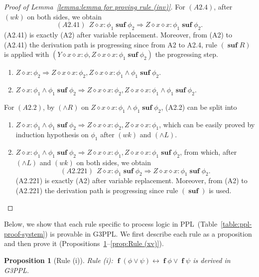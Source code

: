 \documentclass[manuscript,screen]{acmart}
\newtheorem{prop}{Proposition}[section]
\newcommand{\cat}[0]{\diamond}
\newcommand{\GiiiPPLcyc}[0]{\mbox{G3PPL}}
\DeclareMathOperator{\ofst}{\mathbf{f}}
\DeclareMathOperator{\osuf}{\mathbf{suf}}
\newcommand{\PPL}[0]{\mbox{PPL}}
\begin{document}
\begin{proof}[Proof of Lemma~\ref{lemma:lemma for proving rule (inv)}]
For $(A2.4)$, after $(wk)$ on both sides, we obtain
$$
(A2.41)\ \ Z\cat x : \phi_1\osuf\phi_2\Rightarrow Z\cat x\cat x : \phi_1\osuf\phi_2. 
$$
(A2.41) is exactly (A2) after variable replacement. Moreover, from (A2) to (A2.41) the derivation path is progressing since from A2 to A2.4, rule $(\osuf R)$ is applied with $(Y \cat x\cat x : \phi, Z\cat x\cat x : \phi_1\osuf \phi_2)$ the progressing step. 

\ifx
\begin{enumerate}
\item[(A2.1)] $Z\cat x : \phi_2\Rightarrow Z\cat x\cat x : \phi_2, Z\cat x\cat x : \phi_1\wedge \phi_1\osuf \phi_2$. 

\item[(A2.2)] $Z\cat x : \phi_1\wedge \phi_1\osuf \phi_2\Rightarrow Z\cat x\cat x : \phi_2, Z\cat x\cat x : \phi_1\wedge \phi_1\osuf \phi_2$.  
\end{enumerate} 





For $(A2.2)$, by $(\wedge R)$ on $Z\cat x\cat x : \phi_1\wedge \phi_1\osuf \phi_2$, (A2.2) can be split into 
\begin{enumerate}
\item[(A2.21)] $Z\cat x : \phi_1\wedge \phi_1\osuf \phi_2\Rightarrow Z\cat x\cat x : \phi_2, Z\cat x\cat x : \phi_1$, which can be easily proved by induction hypothesis on $\phi_1$ after $(wk)$ and $(\wedge L)$. 
\item[(A2.22)] $Z\cat x : \phi_1\wedge \phi_1\osuf \phi_2\Rightarrow Z\cat x\cat x : \phi_1, Z\cat x\cat x : \phi_1\osuf\phi_2$, from which, after $(\wedge L)$ and $(wk)$ on both sides, we obtain
$$
(A2.221)\ \ Z\cat x : \phi_1\osuf\phi_2\Rightarrow Z\cat x\cat x : \phi_1\osuf\phi_2. 
$$
(A2.221) is exactly (A2) after variable replacement. Moreover, from (A2) to (A2.221) the derivation path is progressing since rule $(\osuf)$ is used. 

\end{enumerate}
\fi

\end{proof}

Below, we show that each rule specific to process logic in \PPL\ (Table~\ref{table:ppl-proof-system}) is provable in \GiiiPPLcyc. We first describe each rule as a proposition and then prove it (Propositions~\ref{prop:Rule (i)}--\ref{prop:Rule (xv)}). 


\begin{prop}[Rule (i)]
    \label{prop:Rule (i)}
Rule (i):
 $\ofst(\phi \vee \psi) \leftrightarrow \ofst \phi \vee \ofst \psi$
 is derived in \GiiiPPLcyc. 
\end{prop}
\end{document}
